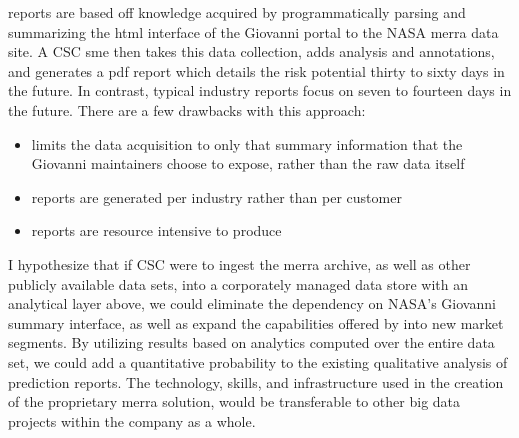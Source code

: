 \climatedge reports are based off knowledge acquired by programmatically parsing and summarizing the \gls{html} interface of the Giovanni\cite{giovanni} portal to the NASA \gls{merra} data site.  A \textsc{CSC} \gls{sme} then takes this data collection, adds analysis and annotations, and generates a \gls{pdf} report which details the risk potential thirty to sixty days in the future. In contrast, typical industry reports focus on seven to fourteen days in the future. There are a few drawbacks with this approach:
\begin{itemize}
    \item{limits the data acquisition to only that summary information that the Giovanni  maintainers choose to expose, rather than the raw data itself}
    \item{reports are generated per industry rather than per customer}
    \item{reports are resource intensive to produce}
\end{itemize}



I hypothesize that if \textsc{CSC} were to ingest the \gls{merra} archive, as well as other publicly available data sets, into a corporately managed data store with an analytical layer above, we could eliminate the dependency on NASA's Giovanni summary interface, as well as expand the capabilities offered by \climatedge into new market segments. By utilizing results based on analytics computed over the entire data set, we could add a quantitative probability to the existing qualitative analysis of \climatedge prediction reports. The technology, skills, and infrastructure used in the creation of the proprietary \gls{merra} solution, would be transferable to other big data projects within the company as a whole.\\

 




